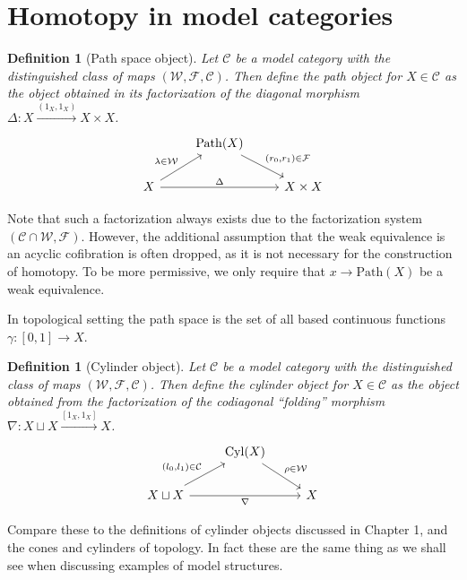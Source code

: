 \documentclass[12pt]{report}
\numberwithin{equation}{section}
\newtheorem{definition}[dummy]{Definition}
\begin{document}
	\section{Homotopy in model categories}
	
	\begin{definition}[Path space object]
		Let $\mathcal{C}$ be a model category with the distinguished class of maps $(\mathcal{W,F,C})$. Then define the path object for $X \in \mathcal{C}$ as the object obtained in its factorization of the diagonal morphism $\Delta: X \xrightarrow{(1_X,1_X)} X \times X$.
		\[\begin{tikzcd}
			& {\mathrm{Path}(X)} \\
			X && {X\times X}
			\arrow["{(r_0,r_1) \in \mathcal{F}}", from=1-2, to=2-3]
			\arrow["{\lambda \in \mathcal{W}}", from=2-1, to=1-2]
			\arrow["{\Delta}", from=2-1, to=2-3]
		\end{tikzcd}\]
	\end{definition}
	Note that such a factorization always exists due to the factorization system $(\mathcal{C} \cap \mathcal{W}, \mathcal{F})$. However, the additional assumption that the weak equivalence is an acyclic cofibration is often dropped, as it is not necessary for the construction of homotopy. To be more permissive, we only require that $x \to \mathrm{Path}(X)$ be a weak equivalence.
	
	In topological setting the path space is the set of all based continuous functions $\gamma:[0,1]\to X$.
	
	\begin{definition}[Cylinder object]
		Let $\mathcal{C}$ be a model category with the distinguished class of maps $(\mathcal{W,F,C})$. Then define the cylinder object for $X \in \mathcal{C}$ as the object obtained from the factorization of the codiagonal ``folding'' morphism $\nabla: X \sqcup X \xrightarrow{[1_X,1_X]} X$.
	\[\begin{tikzcd}
		& {\mathrm{Cyl}(X)} \\
		{X\sqcup X} && X
		\arrow["{\rho\in \mathcal{W}}", from=1-2, to=2-3]
		\arrow["{(l_0,l_1)\in\mathcal{C}}", from=2-1, to=1-2]
		\arrow["\nabla"', from=2-1, to=2-3]
	\end{tikzcd}\]
	\end{definition}
	
	Compare these to the definitions of cylinder objects discussed in Chapter 1, and the cones and cylinders of topology. In fact these are the same thing as we shall see when discussing examples of model structures.
	
\end{document}
